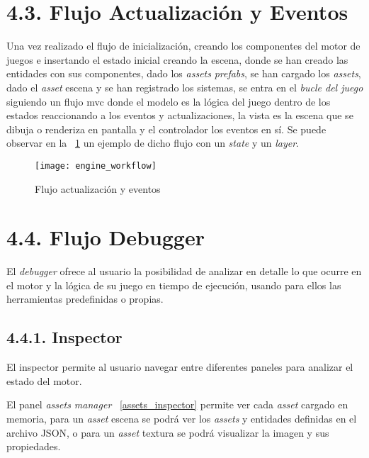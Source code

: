 \section*{4.3. Flujo Actualización y Eventos}\label{sec:workflow_event_update}

Una vez realizado el flujo de inicialización, creando los componentes del motor de juegos e insertando el estado 
inicial creando la escena, donde se han creado las entidades con sus componentes, dado los \textit{assets} \textit{prefabs}, se han cargado los 
\textit{assets}, dado el \textit{asset} escena y se han registrado los sistemas, se entra en el
\textit{bucle del juego}\cite{game-loop-pattern} siguiendo un flujo \gls{mvc}\cite{mvc} donde el modelo es la 
lógica del juego dentro de los estados reaccionando a los eventos y actualizaciones, la vista es la escena que se dibuja o renderiza en pantalla y 
el controlador los eventos en sí. Se puede observar en la \figurename~\ref{engine_workflow} un ejemplo de dicho flujo con un \textit{state}
y un \textit{layer}.
\begin{figure}[h!]
    \centering
    \texttt{[image: engine\_workflow]}
    \caption{Flujo actualización y eventos}
    \label{engine_workflow}
\end{figure}

\section*{4.4. Flujo Debugger}\label{sec:workflow_debugger}

El \textit{debugger} ofrece al usuario la posibilidad de analizar en detalle lo que ocurre en el motor y la lógica de su juego
en tiempo de ejecución, usando para ellos las herramientas predefinidas o propias.

\subsection*{4.4.1. Inspector}\label{sec:workflow_debugger_inspector}

El inspector permite al usuario navegar entre diferentes paneles para analizar el estado del motor.

El panel \textit{assets manager} \figurename~\ref{assets_inspector} 
permite ver cada \textit{asset} cargado en memoria, para un \textit{asset} escena se podrá ver los
\textit{assets} y entidades definidas en el archivo JSON, o para un \textit{asset} textura se podrá
visualizar la imagen y sus propiedades.

